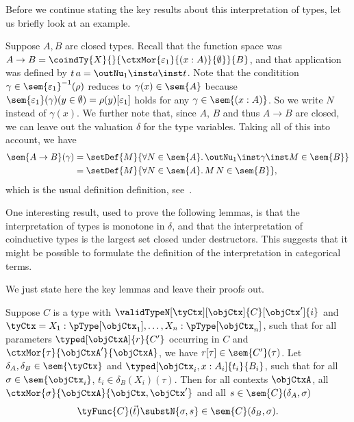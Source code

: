 \documentclass[preprint]{sigplanconf}
\begin{document}
Before we continue stating the key results about this interpretation of types,
let us briefly look at an example.
\begin{example}
  Suppose $A, B$ are closed types.
  Recall that the function space was
  $A \to B = \coindTy{X}{}{\ctxMor{\varepsilon_1}{(x:A)}{\emptyset}}{B}$,
  and that application was defined by $t \, a = \outNu_1 \inst a \inst t$.
  Note that the conditition $\gamma \in \sem{\varepsilon_1}^{-1}(\rho)$ reduces
  to $\gamma(x) \in \sem{A}$ because
  $\sem{\varepsilon_1}(\gamma)(y \in \emptyset) = \rho(y)[\varepsilon_1]$ holds
  for any $\gamma \in \sem{(x : A)}$.
  So we write $N$ instead of $\gamma(x)$.
  We further note that, since $A$, $B$ and thus $A \to B$ are closed,
  we can leave out the valuation $\delta$ for the type variables.
  Taking all of this into account, we have
  \begin{align*}
    \sem{A \to B}(\gamma)
    & = \setDef{M}{\forall N \in \sem{A}. \,
      \outNu_1 \inst \gamma \inst M \in \sem{B}} \\
    & = \setDef{M}{\forall N \in \sem{A}. \, M \, N \in \sem{B}},
  \end{align*}
  which is the usual definition definition, see~\cite{Geuvers:SN-CoC-SAT}.
  \qedDef
\end{example}

\begin{remark}
  One interesting result, used to prove the following
  lemmas, is that the interpretation of types is monotone in $\delta$,
  and that the interpretation of coinductive types is the largest set
  closed under destructors.  This suggests that it might be possible
  to formulate the definition of the interpretation in categorical
  terms.
\end{remark}

We just state here the key lemmas and leave their proofs out.
\begin{lemma}
  \label{lem:ty-functor-sound}
  Suppose $C$ is a type with $\validTypeN[\tyCtx][\objCtx]{C}[\objCtx']{i}$
  and $\tyCtx = X_1 : \pType[\objCtx_1], \dotsc, X_n : \pType[\objCtx_n]$,
  such that for all parameters $\typed[\objCtxA]{r}{C'}$ occurring in $C$
  and $\ctxMor{\tau}{\objCtxA'}{\objCtxA}$, we have
  $r[\tau] \in \sem{C'}(\tau)$.
  Let $\delta_A, \delta_B \in \sem{\tyCtx}$
  and $\typed[\objCtx_i, x : A_i]{t_i}{B_i}$, such that for all
  $\sigma \in \sem{\objCtx_i}$,
  $t_i \in \delta_B(X_i)(\tau)$.
  Then for all contexts $\objCtxA$,
  all $\ctxMor{\sigma}{\objCtxA}{\objCtx, \objCtx'}$ and all
  $s \in \sem{C}(\delta_A, \sigma)$
  \begin{equation}
    \tyFunc{C}(\vec{t})\substN{\sigma, s} \in \sem{C}(\delta_B, \sigma).
  \end{equation}
\end{lemma}
\end{document}
